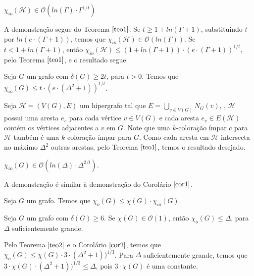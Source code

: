 \documentclass[12pt]{article}
\begin{document}
{\begin{cor} 
	\label{cor1}  
	$\chi_{io}(\mathcal{H}) \in \mathcal{O}(ln(\Gamma) {\cdot} \Gamma^{1/t})$
\end{cor}

	A demonstração segue do Teorema $\ref{teo1}$. Se $t \geq 1 + ln (\Gamma + 1)$, substituindo $t$ por $ln(e {\cdot} (\Gamma + 1))$, temos que $\chi_{io}(\mathcal{H}) \in \mathcal{O}(ln(\Gamma))$. Se $t < 1 + ln (\Gamma + 1)$, então $\chi_{io}(\mathcal{H}) \leq (1 + ln (\Gamma + 1)) {\cdot} (e {\cdot} (\Gamma + 1))^{1/t}$, pelo Teorema $\ref{teo1}$, e o resultado segue. \newbegin
	
\begin{cor}
	\label{cor2}  
	Seja $G$ um grafo com $\delta(G) \geq 2t$, para $t > 0$. Temos que $\chi_{io}(G) \leq t {\cdot} (e {\cdot} (\Delta^2 + 1))^{1/t}$.
\end{cor}
	 
	  Seja $\mathcal{H} = (V(G), E)$ um hipergrafo tal que $E = \bigcup\limits_{v \in V(G)}N_G(v)$, \ie, $\mathcal{H}$ possui uma aresta $e_v$ para cada vértice $v \in V(G)$ e cada aresta $e_v \in E(\mathcal{H})$ contém os vértices adjacentes a $v$ em $G$. Note que uma $k$-coloração  ímpar $c$ para $\mathcal{H}$ também é uma $k$-coloração ímpar para $G$. Como cada aresta em $\mathcal{H}$ intersecta no máximo $\Delta^2$ outras arestas, pelo Teorema $\ref{teo1}$, temos o resultado desejado. \newbegin

\begin{cor}
	\label{cor3}  
	 $\chi_{io}(G) \in \mathcal{O}(ln(\Delta) {\cdot} \Delta^{2/t})$.
\end{cor} 
     A demonstração é similar à demonstração do Corolário $\ref{cor1}$.
\newbegin

\begin{teo}
	\label{teo2}  
	Seja $G$ um grafo. Temos que $\chi_o(G) \leq \chi(G) {\cdot} \chi_{io}(G)$.
\end{teo} \newbegin 

\begin{cor}
	Seja $G$ um grafo com $\delta(G) \geq 6$. Se $\chi(G) \in \mathcal{O}(1)$, então $\chi_o(G) \leq \Delta$, para $\Delta$ suficientemente grande.
\end{cor}
	Pelo Teorema $\ref{teo2}$ e o Corolário $\ref{cor2}$, temos que $\chi_o(G) \leq \chi(G) {\cdot} 3 {\cdot} (\Delta^2 + 1))^{1/3}$. Para $\Delta$ suficientemente grande, temos que $3 {\cdot} \chi(G) {\cdot} (\Delta^2 + 1))^{1/3} \leq \Delta$, pois $3 {\cdot} \chi(G) $ é uma constante.\newbegin

}
\end{document}

